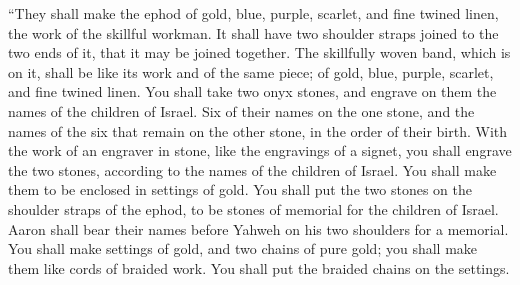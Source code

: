  ``They shall make the ephod of gold, blue, purple, scarlet,
and fine twined linen, the work of the skillful workman.  It
shall have two shoulder straps joined to the two ends of it, that it may
be joined together.  The skillfully woven band, which is on
it, shall be like its work and of the same piece; of gold, blue, purple,
scarlet, and fine twined linen.  You shall take two onyx
stones, and engrave on them the names of the children of Israel.
 Six of their names on the one stone, and the names of the
six that remain on the other stone, in the order of their birth.
 With the work of an engraver in stone, like the engravings
of a signet, you shall engrave the two stones, according to the names of
the children of Israel. You shall make them to be enclosed in settings
of gold.  You shall put the two stones on the shoulder
straps of the ephod, to be stones of memorial for the children of
Israel. Aaron shall bear their names before Yahweh on his two shoulders
for a memorial.  You shall make settings of gold,
 and two chains of pure gold; you shall make them like
cords of braided work. You shall put the braided chains on the settings.

